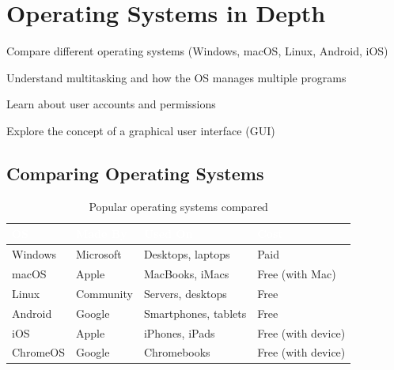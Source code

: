 
\chapter{Operating Systems in Depth}
\label{ch:os-depth}

\begin{objectives}
  \item Compare different operating systems (Windows, macOS, Linux, Android, iOS)
  \item Understand multitasking and how the OS manages multiple programs
  \item Learn about user accounts and permissions
  \item Explore the concept of a graphical user interface (GUI)
\end{objectives}


\section{Comparing Operating Systems}
\label{sec:compare-os}

\begin{table}[H]
\centering
\caption{Popular operating systems compared}
\label{tab:os-compare}
\renewcommand{\arraystretch}{1.3}
\begin{tabularx}{\textwidth}{l l X l}
\toprule
\rowcolor{HeaderRow}
\textcolor{white}{\textbf{OS}} & \textcolor{white}{\textbf{Made By}} & \textcolor{white}{\textbf{Used On}} & \textcolor{white}{\textbf{Cost}} \\
\midrule
\rowcolor{RowLight} Windows & Microsoft & Desktops, laptops & Paid \\
\rowcolor{RowDark} macOS & Apple & MacBooks, iMacs & Free (with Mac) \\
\rowcolor{RowLight} Linux & Community & Servers, desktops & Free \\
\rowcolor{RowDark} Android & Google & Smartphones, tablets & Free \\
\rowcolor{RowLight} iOS & Apple & iPhones, iPads & Free (with device) \\
\rowcolor{RowDark} ChromeOS & Google & Chromebooks & Free (with device) \\
\bottomrule
\end{tabularx}
\end{table}

